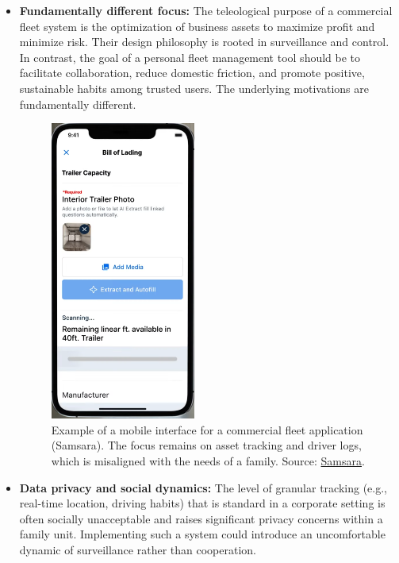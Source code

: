 \begin{itemize}
    \item \textbf{Fundamentally different focus:} The teleological purpose of a commercial fleet system is the optimization of business assets to maximize profit and minimize risk. Their design philosophy is rooted in surveillance and control. In contrast, the goal of a personal fleet management tool should be to facilitate collaboration, reduce domestic friction, and promote positive, sustainable habits among trusted users. The underlying motivations are fundamentally different.

    \begin{figure}[H]
        \centering
        \includegraphics[width=0.45\textwidth]{images/background/samsara-mobile.png}
        \caption{Example of a mobile interface for a commercial fleet application (Samsara). The focus remains on asset tracking and driver logs, which is misaligned with the needs of a family. Source: \href{https://youtu.be/8CWL3REai9E}{Samsara}.}
    \end{figure}

    \textgap

    \item \textbf{Data privacy and social dynamics:} The level of granular tracking (e.g., real-time location, driving habits) that is standard in a corporate setting is often socially unacceptable and raises significant privacy concerns within a family unit. Implementing such a system could introduce an uncomfortable dynamic of surveillance rather than cooperation.


\end{itemize}
